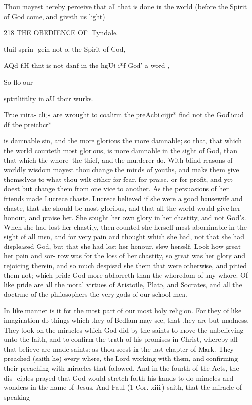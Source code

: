 \documentclass{custom}
\begin{document}
Thou mayest hereby perceive that all that is done in the
world (before the Spirit of God come, and giveth us light) 


218
THE OBEDIENCE OF
[Tyndale.

tluil sprin- 
geih not oi 
the Spirit 
of God, 

AQd fiH thnt 
is not danf 
in the hgUt 
i*f God' a 
word , 

So flo our 

sptriliiitlty 
in aU tbcir 
wurks. 

True mira- 
cli;» are 
wrought to 
coalirm the 
preAcbiicijjr* 
find not the 
Godlicud df 
tbe 
preicbcr* 

is damnable sin, and the more glorious the more damnable;
so that, that which the world counteth most glorious, is 
more damnable in the sight of God, than that which the 
whore, the thief, and the murderer do. With blind reasons 
of worldly wisdom mayest thou change the minds of youths,
and make them give themselves to what thou wilt either for 
fear, for praise, or for profit, and yet doest but change 
them from one vice to another. As the persuasions of 
her friends made Lucrece chaste. Lucrece believed if 
she were a good housewife and chaste, that she should be 
most glorious, and that all the world would give her 
honour, and praise her. She sought her own glory in her 
chastity, and not God's. When she had lost her chastity, 
then counted she herself most abominable in the sight of 
all men, and for very pain and thought which she had, 
not that she had displeased God, but that she had lost her 
honour, slew herself. Look how great her pain and sor- 
row was for the loss of her chastity, so great was her glory 
and rejoicing therein, and so much despised she them that 
were otherwise, and pitied them not; which pride God 
more abhorreth than the whoredom of any whore. Of 
like pride are all the moral virtues of Aristotle, Plato, 
and Socrates, and all the doctrine of the philosophers the 
very gods of our school-men. 

In like manner is it for the most part of our most holy 
religion. For they of like imagination do things which 
they of Bedlam may see, that they are but madness. 
They look on the miracles which God did by the saints to 
move the unbelieving unto the faith, and to confirm the 
truth of his promises in Christ, whereby all that believe 
are made saints: as thou seest in the last chapter of Mark. 
They preached (saith he) every where, the Lord working 
with them, and confirming their preaching with miracles 
that followed. And in the fourth of the Acts, the dis- 
ciples prayed that God would stretch forth his hands to 
do miracles and wonders in the name of Jesus. And 
Paul (1 Cor. xiii.) saith, that the miracle of speaking 
\end{document}
